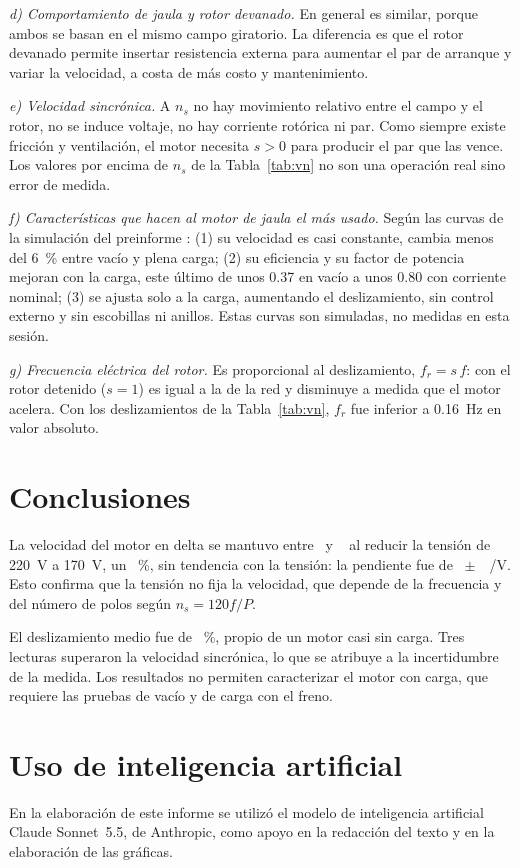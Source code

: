\documentclass[conference]{IEEEtran}
\begin{document}
\emph{d) Comportamiento de jaula y rotor devanado.} En general es similar, porque ambos se basan en el mismo campo giratorio. La diferencia es que el rotor devanado permite insertar resistencia externa para aumentar el par de arranque y variar la velocidad, a costa de más costo y mantenimiento.

\emph{e) Velocidad sincrónica.} A $n_s$ no hay movimiento relativo entre el campo y el rotor, no se induce voltaje, no hay corriente rotórica ni par. Como siempre existe fricción y ventilación, el motor necesita $s>0$ para producir el par que las vence. Los valores por encima de $n_s$ de la Tabla~\ref{tab:vn} no son una operación real sino error de medida.

\emph{f) Características que hacen al motor de jaula el más usado.} Según las curvas de la simulación del preinforme \cite{preinforme}: (1) su velocidad es casi constante, cambia menos del \SI{6}{\percent} entre vacío y plena carga; (2) su eficiencia y su factor de potencia mejoran con la carga, este último de unos \num{0,37} en vacío a unos \num{0,80} con corriente nominal; (3) se ajusta solo a la carga, aumentando el deslizamiento, sin control externo y sin escobillas ni anillos. Estas curvas son simuladas, no medidas en esta sesión.

\emph{g) Frecuencia eléctrica del rotor.} Es proporcional al deslizamiento, $f_r=s\,f$: con el rotor detenido ($s=1$) es igual a la de la red y disminuye a medida que el motor acelera. Con los deslizamientos de la Tabla~\ref{tab:vn}, $f_r$ fue inferior a \SI{0,16}{Hz} en valor absoluto.

\section{Conclusiones}
La velocidad del motor en delta se mantuvo entre \ClMin\ y \ClMax~\si{\rpm} al reducir la tensión de \SI{220}{V} a \SI{170}{V}, un \ClVred~\%, sin tendencia con la tensión: la pendiente fue de \ClSlope~$\pm$~\ClSlopeSE~\si{\rpm/V}. Esto confirma que la tensión no fija la velocidad, que depende de la frecuencia y del número de polos según $n_s=120f/P$.

El deslizamiento medio fue de \ClMeanSlip~\%, propio de un motor casi sin carga. Tres lecturas superaron la velocidad sincrónica, lo que se atribuye a la incertidumbre de la medida. Los resultados no permiten caracterizar el motor con carga, que requiere las pruebas de vacío y de carga con el freno.


\section{Uso de inteligencia artificial}
En la elaboración de este informe se utilizó el modelo de inteligencia artificial Claude Sonnet~5.5, de Anthropic, como apoyo en la redacción del texto y en la elaboración de las gráficas.
\end{document}

